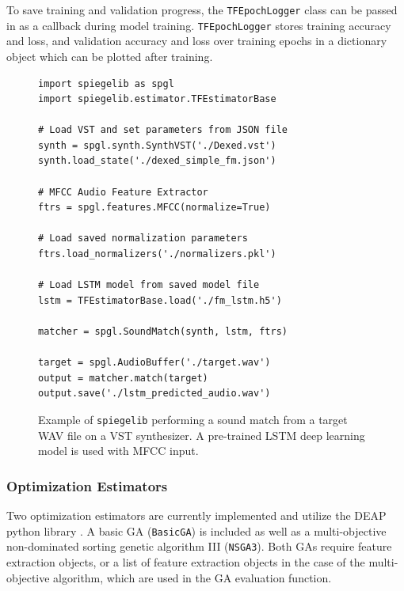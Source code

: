 To save training and validation progress, the \texttt{TFEpochLogger} class can be passed in as a callback during model training. \texttt{TFEpochLogger} stores training accuracy and loss, and validation accuracy and loss over training epochs in a dictionary object which can be plotted after training.

\begin{figure}[t]
\centering
\caption{Example of \texttt{spiegelib} performing a sound match from a target WAV file on a VST synthesizer. A pre-trained LSTM deep learning model is used with MFCC input.}
\footnotesize
\begin{verbatim}
import spiegelib as spgl
import spiegelib.estimator.TFEstimatorBase

# Load VST and set parameters from JSON file
synth = spgl.synth.SynthVST('./Dexed.vst')
synth.load_state('./dexed_simple_fm.json')

# MFCC Audio Feature Extractor
ftrs = spgl.features.MFCC(normalize=True)

# Load saved normalization parameters
ftrs.load_normalizers('./normalizers.pkl')

# Load LSTM model from saved model file
lstm = TFEstimatorBase.load('./fm_lstm.h5')

matcher = spgl.SoundMatch(synth, lstm, ftrs)

target = spgl.AudioBuffer('./target.wav')
output = matcher.match(target)
output.save('./lstm_predicted_audio.wav')
\end{verbatim}
\label{fig:lstm_code}
\end{figure} 

\subsubsection{Optimization Estimators}
Two optimization estimators are currently implemented and utilize the DEAP python library \cite{fortin2012deap}. A basic GA (\texttt{BasicGA}) is included as well as a multi-objective non-dominated sorting genetic algorithm III (\texttt{NSGA3}). Both GAs require feature extraction objects, or a list of feature extraction objects in the case of the multi-objective algorithm, which are used in the GA evaluation function. 

